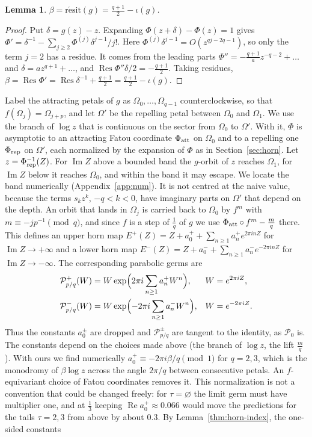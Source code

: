 \documentclass[11pt]{amsart}
\newtheorem{lemma}[theorem]{Lemma}
\theoremstyle{definition}
\theoremstyle{remark}
\newcommand{\PP}{\mathcal{P}_0}
\newcommand{\Res}{\operatorname*{Res}}
\newcommand{\resit}{\operatorname{r\acute{e}sit}}
\begin{document}
\begin{lemma}\label{lem:beta}
$\beta=\resit(g)=\frac{q+1}2-\iota(g)$.
\end{lemma}

\begin{proof}
Put $\delta=g(z)-z$. Expanding $\Phi(z+\delta)-\Phi(z)=1$ gives $\Phi'=\delta^{-1}-\sum_{j\ge2}\Phi^{(j)}\delta^{j-1}/j!$. Here $\Phi^{(j)}\delta^{j-1}=O(z^{qj-2q-1})$, so only the term $j=2$ has a residue. It comes from the leading parts $\Phi''=-\frac{q+1}az^{-q-2}+\dots$ and $\delta=az^{q+1}+\dots$, and $\Res\Phi''\delta/2=-\frac{q+1}2$. Taking residues, $\beta=\Res\Phi'=\Res\delta^{-1}+\frac{q+1}2=\frac{q+1}2-\iota(g)$.
\end{proof}

Label the attracting petals of $g$ as $\Omega_0,\ldots,\Omega_{q-1}$ counterclockwise, so that $f(\Omega_j)=\Omega_{j+p}$, and let $\Omega'$ be the repelling petal between $\Omega_0$ and $\Omega_1$. We use the branch of $\log z$ that is continuous on the sector from $\Omega_0$ to $\Omega'$. With it, $\Phi$ is asymptotic to an attracting Fatou coordinate $\Phi_{\rm att}$ on $\Omega_0$ and to a repelling one $\Phi_{\rm rep}$ on $\Omega'$, each normalized by the expansion of $\Phi$ as in Section~\ref{sec:horn}. Let $z=\Phi_{\rm rep}^{-1}(Z)$. For $\operatorname{Im}Z$ above a bounded band the $g$-orbit of $z$ reaches $\Omega_1$, for $\operatorname{Im}Z$ below it reaches $\Omega_0$, and within the band it may escape. We locate the band numerically (Appendix~\ref{app:num}). It is not centred at the naive value, because the terms $s_kz^k$, $-q<k<0$, have imaginary parts on $\Omega'$ that depend on the depth. An orbit that lands in $\Omega_j$ is carried back to $\Omega_0$ by $f^m$ with $m\equiv-jp^{-1}\pmod q$, and since $f$ is a step of $\frac1q$ of $g$ we use $\Phi_{\rm att}\circ f^m-\frac mq$ there. This defines an upper horn map $E^+(Z)=Z+a^+_0+\sum_{n\ge1}a^+_ne^{2\pi inZ}$ for $\operatorname{Im}Z\to+\infty$ and a lower horn map $E^-(Z)=Z+a^-_0+\sum_{n\ge1}a^-_ne^{-2\pi inZ}$ for $\operatorname{Im}Z\to-\infty$. The corresponding parabolic germs are
\begin{align*}
\mathcal P^+_{p/q}(W)&=W\exp\Bigl(2\pi i\sum_{n\ge1}a^+_nW^n\Bigr),&W&=e^{2\pi iZ},\\
\mathcal P^-_{p/q}(W)&=W\exp\Bigl(-2\pi i\sum_{n\ge1}a^-_nW^n\Bigr),&W&=e^{-2\pi iZ}.
\end{align*}
Thus the constants $a^\pm_0$ are dropped and $\mathcal P^\pm_{p/q}$ are tangent to the identity, as $\PP$ is. The constants depend on the choices made above (the branch of $\log z$, the lift $\frac mq$). With ours we find numerically $a^+_0\equiv-2\pi i\beta/q\pmod1$ for $q=2,3$, which is the monodromy of $\beta\log z$ across the angle $2\pi/q$ between consecutive petals. An $f$-equivariant choice of Fatou coordinates removes it. This normalization is not a convention that could be changed freely: for $\tau=\varnothing$ the limit germ must have multiplier one, and at $\frac13$ keeping $\operatorname{Re}a^+_0\approx0.066$ would move the predictions for the tails $\tau=2,3$ from above by about $0.3$. By Lemma~\ref{thm:horn-index}, the one-sided constants
\end{document}
